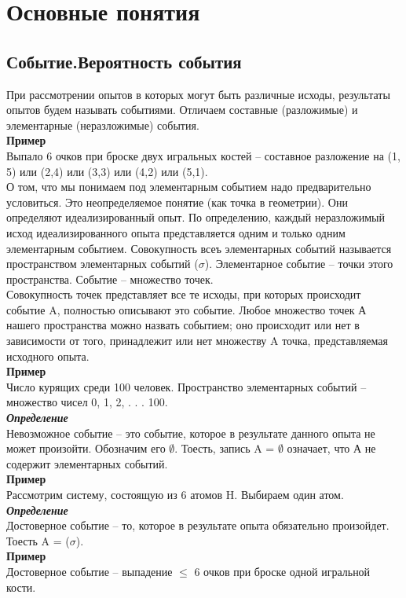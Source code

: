 \documentclass[russian, 12pt]{article}
\begin{document}
\section{Основные понятия}
\subsection{Событие.Вероятность события}
При рассмотрении опытов в которых могут быть различные исходы, результаты опытов будем называть событиями. Отличаем составные (разложимые) и элементарные (неразложимые) события.\\
\textbf{Пример} \\Выпало 6 очков при броске двух игральных костей -- составное разложение на (1, 5) или (2,4) или (3,3) или (4,2) или (5,1). \\
О том, что мы понимаем под элементарным событием надо предварительно условиться. Это неопределяемое понятие (как точка в геометрии). Они определяют идеализированный опыт. По определению, каждый  неразложимый исход идеализированного опыта представляется одним и только одним элементарным событием. Совокупность всеъ элементарных событий называется пространством элементарных событий  ($\sigma$). Элементарное событие -- точки этого пространства. Событие -- множество точек.\\
Совокупность точек представляет все те исходы, при которых происходит событие A, полностью описывают это событие. Любое множество точек А нашего пространства можно назвать событием; оно происходит или нет в зависимости от того, принадлежит или нет множеству A точка, представляемая исходного опыта.\\
\textbf{Пример}\\ Число курящих среди 100 человек. Пространство элементарных событий -- множество чисел 0, 1, 2,  . . . 100.\\
\textit{\textbf{Определение}}\\Невозможное событие -- это событие, которое в результате данного опыта не может произойти. Обозначим его $\emptyset$. Тоесть, запись A = $\emptyset$ означает, что А не содержит элементарных событий.\\
\textbf{Пример}\\Рассмотрим систему, состоящую из 6 атомов H. Выбираем один атом.\\
\textit{\textbf{Определение}} \\Достоверное событие -- то, которое в результате опыта  обязательно произойдет. Тоесть A = ($\sigma$).\\
\textbf{Пример}\\Достоверное событие -- выпадение $\leq$ 6 очков при броске одной игральной кости.\\
\end{document}
